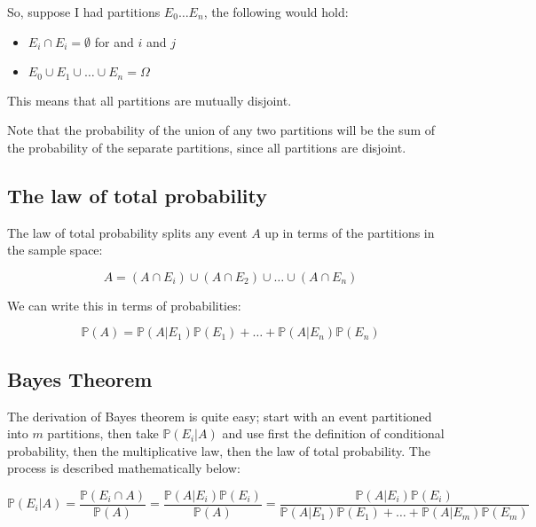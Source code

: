 So, suppose I had partitions $E_0 \dots E_n$, the following would hold:

\begin{itemize}
	\item $E_i \cap E_i = \emptyset$ for and $i$ and $j$
	\item $E_0 \cup E_1 \cup \dots \cup E_n = \Omega$
\end{itemize}

This means that all partitions are mutually disjoint.


Note that the probability of the union of any two partitions will be the sum of
the probability of the separate partitions, since all partitions are disjoint.

\subsection{The law of total probability}

The law of total probability splits any event $A$ up in terms of the partitions
in the sample space:

\begin{dmath}
	A = (A \cap E_i) \cup (A \cap E_2) \cup \dots \cup (A \cap E_n)
\end{dmath}

We can write this in terms of probabilities:

\begin{dmath}
	\mathbb{P}(A) = \mathbb{P}(A|E_1)\mathbb{P}(E_1) + \dots + \mathbb{P}(A|E_n)\mathbb{P}(E_n)
\end{dmath}

\subsection{Bayes Theorem}

The derivation of Bayes theorem is quite easy; start with an event partitioned
into $m$ partitions, then take $\mathbb{P}(E_i|A)$ and use first the definition
of conditional probability, then the multiplicative law, then the law of total
probability. The process is described mathematically below:

\begin{dmath}
	\mathbb{P}(E_i|A) = \frac{\mathbb{P}(E_i \cap A)}{\mathbb{P}(A)} = \frac{\mathbb{P}(A|E_i)\mathbb{P}(E_i)}{\mathbb{P}(A)} = \frac{\mathbb{P}(A|E_i)\mathbb{P}(E_i)}{\mathbb{P}(A|E_1)\mathbb{P}(E_1) + \dots + \mathbb{P}(A|E_m)\mathbb{P}(E_m)}
\end{dmath}

